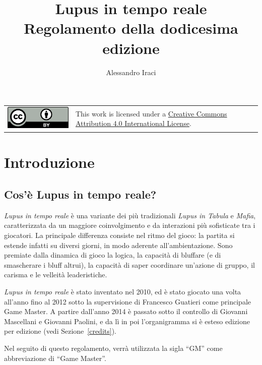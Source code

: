 \documentclass[a4paper,10pt]{article}
\title{Lupus in tempo reale \\ Regolamento della dodicesima edizione}
\author{Alessandro Iraci}
\begin{document}
\maketitle

\begin{tabular}{lp{}}
      \begin{minipage}{0.22\textwidth}
            \vspace{3mm}
            \href{http://creativecommons.org/licenses/by/4.0/}{\includegraphics{ccby.pdf}}
      \end{minipage}
       &
      This work is licensed under a \href{http://creativecommons.org/licenses/by/4.0/}{Creative Commons Attribution 4.0 International License}.
\end{tabular}


\section{Introduzione}

\subsection{Cos'è Lupus in tempo reale?}

\emph{Lupus in tempo reale} è una variante dei più tradizionali \emph{Lupus in Tabula} e \emph{Mafia}, caratterizzata da un maggiore coinvolgimento e da interazioni più sofisticate tra i giocatori.
La principale differenza consiste nel ritmo del gioco: la partita si estende infatti su diversi giorni, in modo aderente all'ambientazione.
Sono premiate dalla dinamica di gioco la logica, la capacità di bluffare (e di smascherare i bluff altrui), la capacità di saper coordinare un'azione di gruppo, il carisma e le velleità leaderistiche.

\emph{Lupus in tempo reale} è stato inventato nel 2010, ed è stato giocato una volta all'anno fino al 2012 sotto la supervisione di Francesco Guatieri come principale Game Master. A partire dall'anno 2014 è passato sotto il controllo di Giovanni Mascellani e Giovanni Paolini, e da lì in poi l'organigramma si è esteso edizione per edizione (vedi Sezione~\ref{credits}).

Nel seguito di questo regolamento, verrà utilizzata la sigla ``GM'' come abbreviazione di ``Game Master''.
\end{document}

